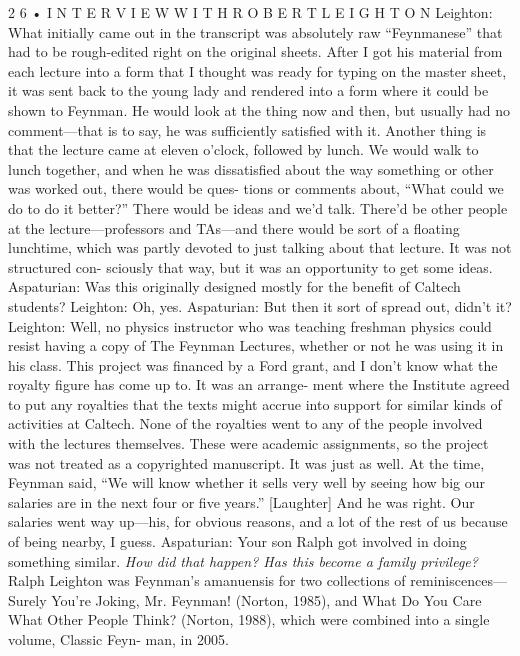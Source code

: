 \documentclass[10pt,oneside]{article}
\begin{document}
2 6 • I N T E R V I E W  W I T H  R O B E R T  L E I G H T O N Leighton: What initially came out in the transcript was absolutely raw “Feynmanese” that had to be rough-edited right on the original sheets. After I got his material from each lecture into a form that I thought was ready for typing on the master sheet, it was sent back to the young lady and rendered into a form where it could be shown to Feynman. He would look at the thing now and then, but usually had no comment---that is to say, he was sufficiently satisfied with it. Another thing is that the lecture came at eleven o’clock, followed by lunch. We would walk to lunch together, and when he was dissatisfied about the way something or other was worked out, there would be ques- tions or comments about, “What could we do to do it better?” There would be ideas and we’d talk. There’d be other people at the lecture---professors and TAs---and there would be sort of a floating lunchtime, which was partly devoted to just talking about that lecture. It was not structured con- sciously that way, but it was an opportunity to get some ideas. Aspaturian: Was this originally designed mostly for the benefit of Caltech students? Leighton: Oh, yes. Aspaturian: But then it sort of spread out, didn’t it? Leighton: Well, no physics instructor who was teaching freshman physics could resist having a copy of The Feynman Lectures, whether or not he was using it in his class. This project was financed by a Ford grant, and I don’t know what the royalty figure has come up to. It was an arrange- ment where the Institute agreed to put any royalties that the texts might accrue into support for similar kinds of activities at Caltech. None of the royalties went to any of the people involved with the lectures themselves. These were academic assignments, so the project was not treated as a copyrighted manuscript. It was just as well. At the time, Feynman said, “We will know whether it sells very well by seeing how big our salaries are in the next four or five years.” [Laughter] And he was right. Our salaries went way up---his, for obvious reasons, and a lot of the rest of us because of being nearby, I guess. Aspaturian: Your son Ralph got involved in doing something similar.\emph{ How did that happen? Has this become a family privilege? } Ralph Leighton was Feynman’s amanuensis for two collections of reminiscences--- Surely You’re Joking, Mr. Feynman! (Norton, 1985), and What Do You Care What Other People Think? (Norton, 1988), which were combined into a single volume, Classic Feyn- man, in 2005.\par
\end{document}
